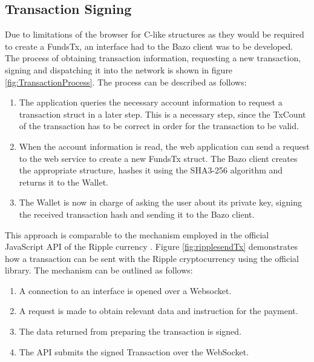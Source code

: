 \subsection{Transaction Signing}\label{transactionsigning}
Due to limitations of the browser for C-like structures as they would be required to create a FundsTx, an interface had to the Bazo client was to be developed. 
The process of obtaining transaction information, requesting a new transaction, signing and dispatching it into the network is shown in figure \ref{fig:TransactionProcess}. The process can be described as follows:
\begin{enumerate}
\item The application queries the necessary account information to request a transaction struct in a later step. This is a necessary step, since the TxCount of the transaction has to be correct in order for the transaction to be valid.
\item When the account information is read, the web application can send a request to the web service to create a new FundsTx struct. The Bazo client creates the appropriate structure, hashes it using the SHA3-256 algorithm and returns it to the Wallet.
\item The Wallet is now in charge of asking the user about its private key, signing the received transaction hash and sending it to the Bazo client.
\end{enumerate}

This approach is comparable to the mechanism employed in the official JavaScript API of the Ripple currency \cite{ripplelib}.
Figure \ref{fig:ripplesendTx} demonstrates how a transaction can be sent with the Ripple cryptocurrency using the official library. The mechanism can be outlined as follows:
\begin{enumerate}
\item A connection to an interface is opened over a Websocket. 
\item A request is made to obtain relevant data and instruction for the payment.
\item The data returned from preparing the transaction is signed.
\item The API submits the signed Transaction over the WebSocket.
\end{enumerate}



